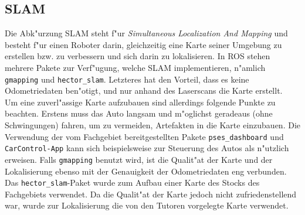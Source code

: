 \subsection{SLAM}
\label{subsec:02slam}

Die Abk"urzung SLAM steht f"ur \emph{Simultaneous Localization And Mapping} und besteht f"ur einen Roboter darin, gleichzeitig eine Karte seiner Umgebung zu erstellen bzw. zu verbessern und sich darin zu lokalisieren. In ROS stehen mehrere Pakete zur Verf"ugung, welche SLAM implementieren, n"amlich \texttt{gmapping} und \texttt{hector\_slam}. Letzteres hat den Vorteil, dass es keine Odometriedaten ben"otigt, und nur anhand des Laserscans die Karte erstellt.\\
Um eine zuverl"assige Karte aufzubauen sind allerdings folgende Punkte zu beachten. Erstens muss das Auto langsam und m"oglichst geradeaus (ohne Schwingungen) fahren, um zu vermeiden, Artefakten in die Karte einzubauen. Die Verwendung der vom Fachgebiet bereitgestellten Pakete \texttt{pses\_dashboard} und \texttt{CarControl-App} kann sich beispielsweise zur Steuerung des Autos als n"utzlich erweisen. Falls \texttt{gmapping} benutzt wird, ist die Qualit"at der Karte und der Lokalisierung ebenso mit der Genauigkeit der Odometriedaten eng verbunden.\\
Das \texttt{hector\_slam}-Paket wurde zum Aufbau einer Karte des Stocks des Fachgebiets verwendet. Da die Qualit"at der Karte jedoch nicht zufriedenstellend war, wurde zur Lokalisierung die von den Tutoren vorgelegte Karte verwendet.